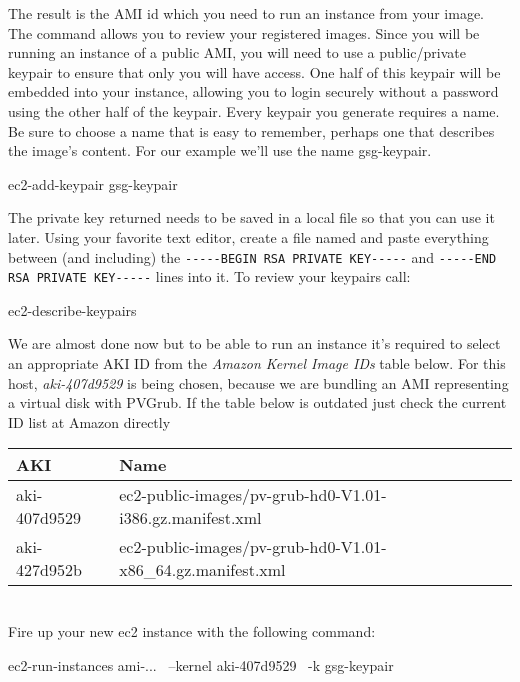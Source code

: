 The result is the AMI id which you need to run an instance from
your image. The command  allows you to review your
registered images. Since you will be running an instance of a public AMI,
you will need to use a public/private keypair to ensure that only you
will have access. One half of this keypair will be embedded into your
instance, allowing you to login securely without a password using the
other half of the keypair. Every keypair you generate requires a name.
Be sure to choose a name that is easy to remember, perhaps one that
describes the image's content. For our example we'll use the name
gsg-keypair.

\begin{Command}{10cm}
ec2-add-keypair gsg-keypair
\end{Command}

The private key returned needs to be saved in a local file so that
you can use it later. Using your favorite text editor, create a file
named  and paste everything between
(and including) the \texttt{-{}-{}-{}-{}-BEGIN RSA PRIVATE KEY-{}-{}-{}-{}-} and
\texttt{-{}-{}-{}-{}-END RSA PRIVATE KEY-{}-{}-{}-{}-} lines into it. To review
your keypairs call:

\begin{Command}{10cm}
ec2-describe-keypairs
\end{Command}

We are almost done now but to be able to run an instance it's
required to select an appropriate AKI ID from the
\textit{Amazon Kernel Image IDs} table below. For this host,
\textit{aki-407d9529} is being chosen, because we are bundling
an AMI representing a virtual disk with PVGrub. If the table
below is outdated just check the current ID list at Amazon
directly

\begin{tabular}[h]{|p{3cm}|p{6cm}|}
\hline
\textbf{AKI} & \textbf{Name} \\
\hline
aki-407d9529 & ec2-public-images/pv-grub-hd0-V1.01-i386.gz.manifest.xml \\
aki-427d952b & ec2-public-images/pv-grub-hd0-V1.01-x86\_64.gz.manifest.xml \\
\hline
\end{tabular}\\

Fire up your new ec2 instance with the following command:

\begin{Command}{13cm}
ec2-run-instances ami-... \
  --kernel aki-407d9529 \
  -k gsg-keypair
\end{Command}

